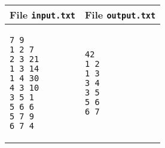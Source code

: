 \documentclass[a4paper,11pt]{article}
\begin{document}
  
    \noindent
    \begin{tabular}{p{11cm}|p{5cm}}
    \toprule
    \textbf{File \texttt{input.txt}}
    & \textbf{File \texttt{output.txt}}
    \\
    \midrule
    \scriptsize
    \begin{verbatim}
7 9
1 2 7
2 3 21
1 3 14
1 4 30
4 3 10
3 5 1
5 6 6
5 7 9
6 7 4
    \end{verbatim}
    &
    \scriptsize
    \begin{verbatim}
42
1 2
1 3
3 4
3 5
5 6
6 7
    \end{verbatim}
    \\
    \bottomrule
    \end{tabular}
  
\end{document}
